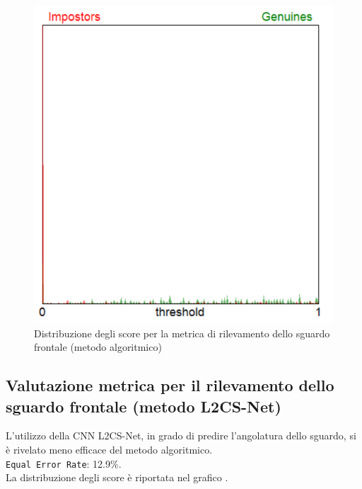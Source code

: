 \documentclass[12pt,a4paper,openright,twoside]{book}
\begin{document}
\begin{figure}
    \centering
    \includegraphics[width=.8\linewidth]{figures/score-distribution-frontal-gaze-algo.png}
    \caption{Distribuzione degli score per la metrica di rilevamento dello sguardo frontale (metodo algoritmico)}
    \label{fig:score_distribution_frontal_gaze_algo}
\end{figure}

\subsection{Valutazione metrica per il rilevamento dello sguardo frontale (metodo L2CS-Net)}
L'utilizzo della CNN L2CS-Net, in grado di predire l'angolatura dello sguardo, si è rivelato meno efficace del metodo algoritmico. \\[4pt]
\texttt{Equal Error Rate}: 12.9\%. \\
La distribuzione degli score è riportata nel grafico .
\end{document}
